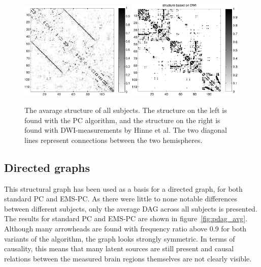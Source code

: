 \documentclass[a4paper, english]{article}
\begin{document}
\begin{figure}[h!]
  \centering
  \includegraphics[width=0.49\textwidth]{images/struct_full}
  \includegraphics[width=0.49\textwidth]{images/structure_max}
  \caption{The avarage structure of all subjects. The structure on the left is found with the PC algorithm, and the structure on the right is found with DWI-measurements by Hinne et al. The two diagonal lines represent connections between the two hemispheres.}
\label{fig:struct_avg}
\end{figure}

\subsection{Directed graphs}
This structural graph has been used as a basis for a directed graph, for both standard PC and EMS-PC.
As there were little to none notable differences between different subjects, only the average DAG across all subjects is presented.
The results for standard PC and EMS-PC are shown in figure~\ref{fig:pdag_avg}.
Although many arrowheads are found with frequency ratio above 0.9 for both variants of the algorithm, the graph looks strongly symmetric.
In terms of causality, this means that many latent sources are still present and causal relations between the measured brain regions themselves are not clearly visible.
\end{document}
